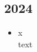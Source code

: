 \subsection{2024}
\begin{history}


    \begin{itemize}

        \item x\\
              text

    \end{itemize}

\end{history}
